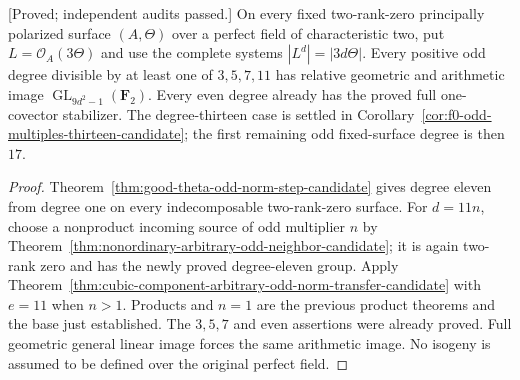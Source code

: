 \begin{corollary}
\label{cor:f0-odd-multiples-eleven-candidate}
\textup{[Proved; independent audits passed.]}
On every fixed two-rank-zero principally polarized surface $(A,\Theta)$
over a perfect field of characteristic two, put $L=\mathcal O_A(3\Theta)$
and use the complete systems $|L^d|=|3d\Theta|$. Every positive odd
degree divisible by at
least one of $3,5,7,11$ has relative geometric and arithmetic image
$\operatorname{GL}_{9d^2-1}(\mathbf F_2)$. Every even degree already
has the proved full one-covector stabilizer. The degree-thirteen case
is settled in Corollary~\ref{cor:f0-odd-multiples-thirteen-candidate};
the first remaining odd fixed-surface degree is then $17$.
\end{corollary}
\begin{proof}
Theorem~\ref{thm:good-theta-odd-norm-step-candidate} gives degree eleven
from degree one on every
indecomposable two-rank-zero surface. For $d=11n$, choose a nonproduct
incoming source of odd multiplier $n$ by
Theorem~\ref{thm:nonordinary-arbitrary-odd-neighbor-candidate}; it is
again two-rank zero and has the newly proved degree-eleven group.
Apply Theorem~\ref{thm:cubic-component-arbitrary-odd-norm-transfer-candidate}
with $e=11$ when $n>1$. Products and $n=1$ are the previous product
theorems and the base just established. The $3,5,7$ and even assertions
were already proved. Full geometric general linear image forces the
same arithmetic image. No isogeny is assumed to be defined over the
original perfect field.
\end{proof}

